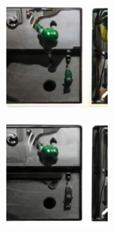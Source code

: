 \documentclass{article}
\begin{document}
\begin{figure}
\begin{subfigure}[b]{0.5\linewidth}
\begin{subfigure}[b]{0.242\linewidth}
        \end{subfigure}
        \begin{subfigure}[b]{0.242\linewidth}
        \includegraphics[width=\linewidth]{figures/imagenet128/solver_samples/imagenet128_fm_ot_51_20.png}
        \end{subfigure}
        \begin{subfigure}[b]{0.242\linewidth}
        \includegraphics[width=\linewidth]{figures/imagenet128/solver_samples/imagenet128_fm_ot_51_50.png}
        \end{subfigure}
    \end{subfigure}\\
    

\end{figure}
\end{document}
